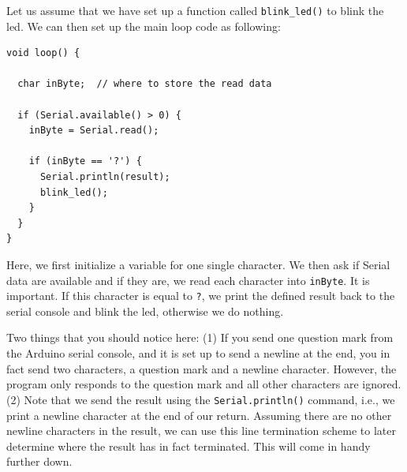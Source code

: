 Let us assume that we have set up a function called \lstinline{blink_led()} to blink the \ac{led}. We can then set up the main loop code as following:
\begin{lstlisting}
void loop() {

  char inByte;  // where to store the read data
  
  if (Serial.available() > 0) {
    inByte = Serial.read();

    if (inByte == '?') {
      Serial.println(result);
      blink_led();
    } 
  }
}
\end{lstlisting}
Here, we first initialize a variable for one single character. We then ask if Serial data are available and if they are, we read each character into \lstinline{inByte}. It is important. If this character is equal to \lstinline{?}, we print the defined result back to the serial console and blink the \ac{led}, otherwise we do nothing. 

Two things that you should notice here: (1) If you send one question mark from the Arduino serial console, and it is set up to send a newline at the end, you in fact send two characters, a question mark and a newline character. However, the program only responds to the question mark and all other characters are ignored. (2) Note that we send the result using the \lstinline{Serial.println()} command, i.e., we print a newline character at the end of our return. Assuming there are no other newline characters in the result, we can use this line termination scheme to later determine where the result has in fact terminated. This will come in handy further down.


